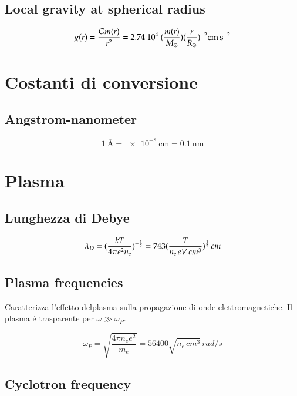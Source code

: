 \documentclass[main.tex]{subfiles}
\begin{document}
\subsection{Local gravity at spherical radius}
\begin{equation*}
g(r)=\frac{Gm(r)}{r^2}=2.74\sci{4}(\frac{m(r)}{\msun})(\frac{r}{\rsun})^{-2}\si{\cm\per\square\second}
\end{equation*}


\section{Costanti di conversione}

\subsection{Angstrom-nanometer}
\begin{equation*}
\SI{1}{\angstrom}=\SI{e-8}{\cm}=\SI{0.1}{\nano\meter}
\end{equation*}

\section{Plasma}

\subsection{Lunghezza di Debye}

\begin{equation*}
\lambda_D=(\frac{kT}{4\pi e^2n_e})^{-\frac{1}{2}}=743(\frac{T}{n_e\,eV\,cm^3})^{\frac{1}{2}}\,cm
\end{equation*}

\subsection{Plasma frequencies}
Caratterizza l'effetto delplasma sulla propagazione di onde elettromagnetiche. Il plasma \'e trasparente per $\omega\gg\omega_P$.

\begin{equation*}
\omega_P=\sqrt{\frac{4\pi n_ee^2}{m_e}}=56400\sqrt{n_e\,cm^3}\,rad/s
\end{equation*}

\subsection{Cyclotron frequency}
\end{document}
